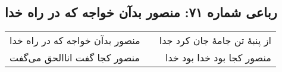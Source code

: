 \begin{center}
\section*{رباعی شماره ۷۱: منصور بدآن خواجه که در راه خدا}
\label{sec:0071}
\begin{longtable}{l p{0.5cm} r}
منصور بدآن خواجه که در راه خدا
&&
از پنبهٔ تن جامهٔ جان کرد جدا
\\
منصور کجا گفت اناالحق می‌گفت
&&
منصور کجا بود خدا بود خدا
\\
\end{longtable}
\end{center}
